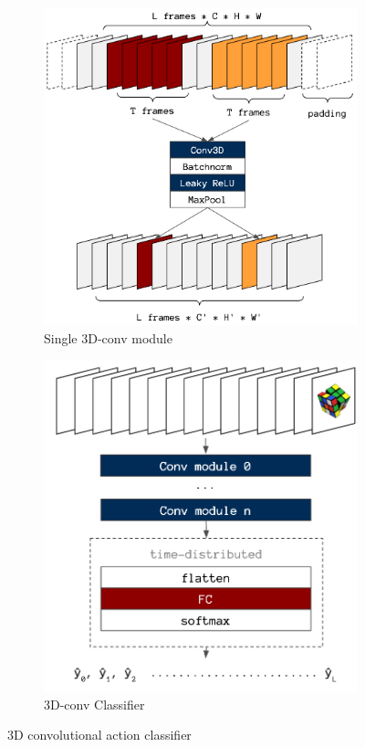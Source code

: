 \documentclass[10pt,twocolumn,letterpaper]{article}
\begin{document}
\begin{figure}[]
  \begin{subfigure}[b]{0.23\textwidth}
    \includegraphics[width=\textwidth]{single_conv3d.png}
    \caption{Single 3D-conv module}
    \label{fig:single_conv3d}
  \end{subfigure}
  \begin{subfigure}[b]{0.23\textwidth}
    \includegraphics[width=\textwidth]{conv3d.png}
    \caption{3D-conv Classifier}
    \label{fig:conv3d}
  \end{subfigure}
  \caption{3D convolutional action classifier}
\end{figure}
\end{document}

